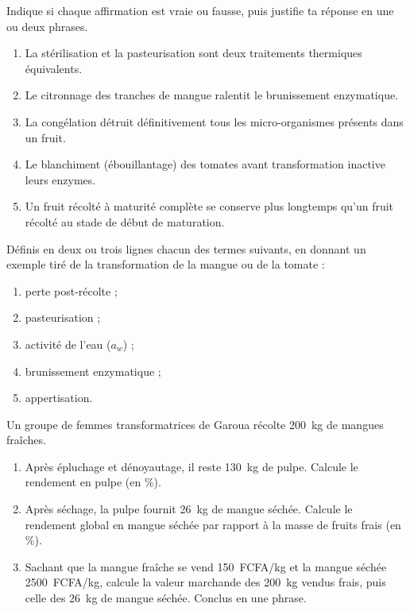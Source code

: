 \documentclass[11pt]{article}
\begin{document}
\begin{exercice}
Indique si chaque affirmation est vraie ou fausse, puis justifie ta réponse en une ou deux phrases.
\begin{enumerate}
\item La stérilisation et la pasteurisation sont deux traitements thermiques équivalents.
\item Le citronnage des tranches de mangue ralentit le brunissement enzymatique.
\item La congélation détruit définitivement tous les micro-organismes présents dans un fruit.
\item Le blanchiment (ébouillantage) des tomates avant transformation inactive leurs enzymes.
\item Un fruit récolté à maturité complète se conserve plus longtemps qu'un fruit récolté au stade de début de maturation.
\end{enumerate}
\end{exercice}

\begin{exercice}[Définitions]
Définis en deux ou trois lignes chacun des termes suivants, en donnant un exemple tiré de la transformation de la mangue ou de la tomate :
\begin{enumerate}
\item perte post-récolte ;
\item pasteurisation ;
\item activité de l'eau ($a_w$) ;
\item brunissement enzymatique ;
\item appertisation.
\end{enumerate}
\end{exercice}

\begin{exercice}
Un groupe de femmes transformatrices de Garoua récolte \SI{200}{kg} de mangues fraîches.
\begin{enumerate}
\item Après épluchage et dénoyautage, il reste \SI{130}{kg} de pulpe. Calcule le rendement en pulpe (en \%).
\item Après séchage, la pulpe fournit \SI{26}{kg} de mangue séchée. Calcule le rendement global en mangue séchée par rapport à la masse de fruits frais (en \%).
\item Sachant que la mangue fraîche se vend \SI{150}{FCFA/kg} et la mangue séchée \SI{2500}{FCFA/kg}, calcule la valeur marchande des \SI{200}{kg} vendus frais, puis celle des \SI{26}{kg} de mangue séchée. Conclus en une phrase.
\end{enumerate}
\end{exercice}
\end{document}
